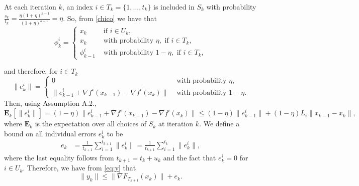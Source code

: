 \documentclass[11pt]{article}
\newcommand{\E}{\mathbf{E}}
\begin{document}
At each iteration $k$, an index $i\in T_k =  \{1,\ldots,t_k\}$ is included in $S_k$ with probability $\frac{s_k}{t_k} = \frac{\eta (1+\eta)^{k-1}}{(1+\eta)^{k-1}} = \eta $. So, from \eqref{chico} we have that
\[
\phi_{k}^i=
 \begin{cases}
   x_k &\mbox{ if } i\in U_k, \\
   x_k  &\mbox{ with probability }\eta , \mbox{ if } i \in T_k,\\
   \phi_{k-1}^i & \mbox{ with probability }1-\eta , \mbox{ if } i \in T_k,
 \end{cases}
\]

and therefore, for $i\in T_k$
\[
\|e_k^i\| =
 \begin{cases}
  0  & \mbox{ with probability }\eta,\\
  \|e_{k-1}^i + \nabla f^i(x_{k-1}) - \nabla f^i(x_k) \| & \mbox{ with probability }1-\eta .
 \end{cases}
\]
 Then, using Assumption A.2., %
\begin{equation}\label{eq:expec}
 \E_k[\|e_k^i\|] = (1-\eta)\|e_{k-1}^i + \nabla f^i(x_{k-1}) - \nabla f^i(x_k) \| \leq (1-\eta)\|e_{k-1}^i\| + (1-\eta)L_i \|x_{k-1} - x_k\|,
\end{equation}
where $\E_k$ is the expectation over all choices of $S_k$ at iteration $k$. We define a bound on all individual errors $e_k^i$ to be
\begin{align}
 e_k &= \frac{1}{t_{k+1}} \sum_{i=1}^{t_{k+1}} \|e_k^i\| = \frac{1}{t_{k+1}}\sum_{i=1}^{t_k}\|e_k^i\|\label{eq:defe},
\end{align}
where the last equality follows from $t_{k+1}= t_k +u_k$ and  the fact that $e_k^i =0$ for $i \in U_k$. Therefore, we have from \eqref{eq:y} that
\begin{equation} \label{yfe}
    \| y_k \| \leq \| \nabla F_{T_{k+1}}(x_k) \| + e_k.
\end{equation}  

\bigskip
\end{document}
